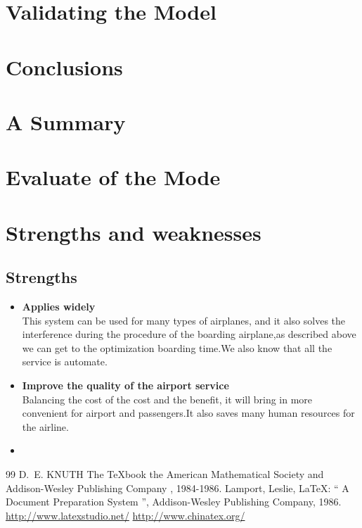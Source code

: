 ﻿\documentclass{mcmthesis}
\begin{document}
\section{Validating the Model}
\lipsum[9]

\section{Conclusions}
\lipsum[6]

\section{A Summary}
\lipsum[6]

\section{Evaluate of the Mode}

\section{Strengths and weaknesses}
\lipsum[12]

\subsection{Strengths}
\begin{itemize}
\item \textbf{Applies widely}\\
This  system can be used for many types of airplanes\cite{1, 2}, and it also
solves the interference during  the procedure of the boarding
airplane,as described above we can get to the  optimization
boarding time.We also know that all the service is automate.
\item \textbf{Improve the quality of the airport service}\\
Balancing the cost of the cost and the benefit, it will bring in
more convenient  for airport and passengers.It also saves many
human resources for the airline. \item \textbf{}
\end{itemize}

\begin{thebibliography}{99}
 D.~E. KNUTH   The \TeX{}book  the American
Mathematical Society and Addison-Wesley
Publishing Company , 1984-1986.
Lamport, Leslie,  \LaTeX{}: `` A Document Preparation System '',
Addison-Wesley Publishing Company, 1986.
\url{http://www.latexstudio.net/}
\url{http://www.chinatex.org/}
\end{thebibliography}
\end{document}
